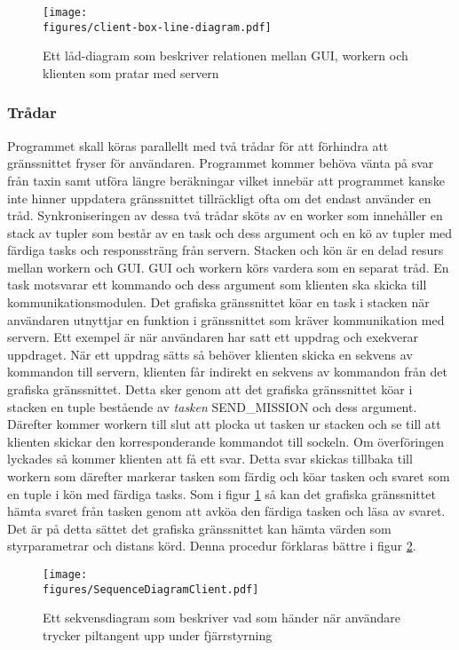 \documentclass[tekniskrapport/tech.tex]{subfiles}
\begin{document}
\begin{figure}[h]
\centering
	\texttt{[image: \\figures/client-box-line-diagram.pdf]}
	\caption{Ett låd-diagram som beskriver relationen mellan GUI,
	workern och klienten som pratar med servern}
	\label{boxclient}
\end{figure} 

\subsubsection{Trådar}
Programmet skall köras parallellt med två trådar för att förhindra att
gränssnittet fryser för användaren. Programmet kommer behöva vänta på svar från
taxin samt utföra längre beräkningar vilket innebär att programmet kanske inte
hinner uppdatera gränssnittet tillräckligt ofta om det endast använder en tråd.
Synkroniseringen av dessa två trådar sköts av en worker som innehåller en stack
av tupler som består av en task och dess argument och en kö av tupler med
färdiga tasks och responssträng från servern. Stacken och kön är en delad resurs
mellan workern och GUI. GUI och workern körs vardera som en separat tråd. En
task motsvarar ett kommando och dess argument som klienten ska skicka till
kommunikationsmodulen. Det grafiska gränssnittet köar en task i stacken när
användaren utnyttjar en funktion i gränssnittet som kräver kommunikation med
servern. Ett exempel är när användaren har satt ett uppdrag och exekverar
uppdraget. När ett uppdrag sätts så behöver klienten skicka en sekvens av
kommandon till servern, klienten får indirekt en sekvens av kommandon från det
grafiska gränssnittet. Detta sker genom att det grafiska gränssnittet köar i
stacken en tuple bestående av \emph{tasken} SEND\_MISSION och dess argument.
Därefter kommer workern till slut att plocka ut tasken ur stacken och se till
att klienten skickar den korresponderande kommandot till sockeln. Om
överföringen lyckades så kommer klienten att få ett svar. Detta svar skickas
tillbaka till workern som därefter markerar tasken som färdig och köar tasken
och svaret som en tuple i kön med färdiga tasks. Som i figur \ref{boxclient} så
kan det grafiska gränssnittet hämta svaret från tasken genom att avköa den
färdiga tasken och läsa av svaret. Det är på detta sättet det grafiska
gränssnittet kan hämta värden som styrparametrar och distans körd. Denna
procedur förklaras bättre i figur \ref{sequenceremote}.



\begin{figure}[h]
\centering
	\texttt{[image: \\figures/SequenceDiagramClient.pdf]}
	\caption{Ett sekvensdiagram som beskriver vad som händer när användare trycker
    piltangent upp under fjärrstyrning}
	\label{sequenceremote}
\end{figure}
\end{document}
